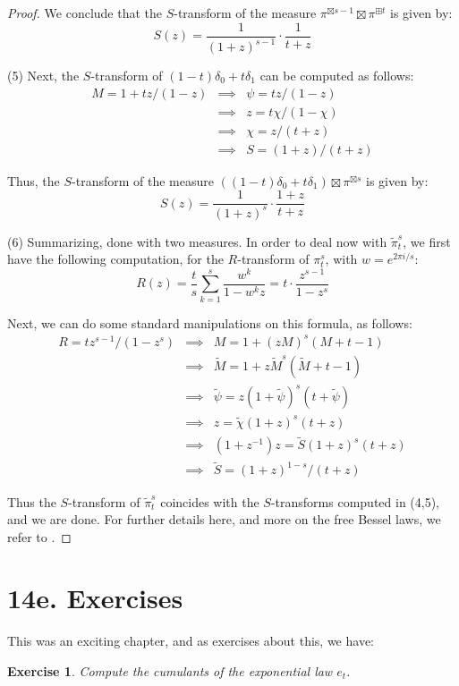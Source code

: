 \documentclass[12pt]{amsbook}
\newtheorem{exercise}[theorem]{Exercise}
\begin{document}
\begin{proof}
We conclude that the $S$-transform of the measure $\pi^{\boxtimes s-1}\boxtimes\pi^{\boxplus t}$ is given by:
$$S(z)=\frac{1}{(1+z)^{s-1}}\cdot\frac{1}{t+z}$$

(5) Next, the $S$-transform of $(1-t)\delta_0+t\delta_1$ can be computed as follows:
\begin{eqnarray*}
M=1+tz/(1-z)
&\implies&\psi=tz/(1-z)\\
&\implies&z=t\chi/(1-\chi)\\
&\implies&\chi=z/(t+z)\\
&\implies& S=(1+z)/(t+z)
\end{eqnarray*}

Thus, the $S$-transform of the measure $((1-t)\delta_0+t\delta_1)\boxtimes\pi^{\boxtimes s}$ is given by:
$$S(z)=\frac{1}{(1+z)^s}\cdot\frac{1+z}{t+z}$$

(6) Summarizing, done with two measures. In order to deal now with $\tilde{\pi}^s_t$, we first have the following computation, for the $R$-transform of $\pi^s_t$, with $w=e^{2\pi i/s}$:
$$R(z)=\frac{t}{s}\sum_{k=1}^s\frac{w^k}{1-w^kz}=t\cdot\frac{z^{s-1}}{1-z^s}$$ 

Next, we can do some standard manipulations on this formula, as follows:
\begin{eqnarray*}
R=tz^{s-1}/(1-z^s)
&\implies&M=1+(zM)^s(M+t-1)\\
&\implies&\tilde{M}=1+z\tilde{M}^s(\tilde{M}+t-1)\\
&\implies&\tilde{\psi}=z(1+\tilde{\psi})^s(t+\tilde{\psi})\\
&\implies&z=\tilde{\chi}(1+z)^s(t+z)\\
&\implies&(1+z^{-1})z=\tilde{S}(1+z)^s(t+z)\\
&\implies&\tilde{S}=(1+z)^{1-s}/(t+z)
\end{eqnarray*}

Thus the $S$-transform of $\tilde{\pi}^s_t$ coincides with the $S$-transforms computed in (4,5), and we are done. For further details here, and more on the free Bessel laws, we refer to \cite{bb+}.
\end{proof}

\section*{14e. Exercises}

This was an exciting chapter, and as exercises about this, we have:

\begin{exercise}
Compute the cumulants of the exponential law $e_t$.
\end{exercise}
\end{document}
